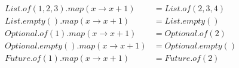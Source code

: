 \begin{align*}
  List.of(1,2,3).map(x \to x + 1) & = List.of(2,3,4) \\
  List.empty().map(x \to x + 1) & = List.empty() \\
  Optional.of(1).map(x \to x + 1) & = Optional.of(2) \\
  Optional.empty().map(x \to x + 1) & = Optional.empty() \\
  Future.of(1).map(x \to x + 1) & = Future.of(2)
\end{align*}
